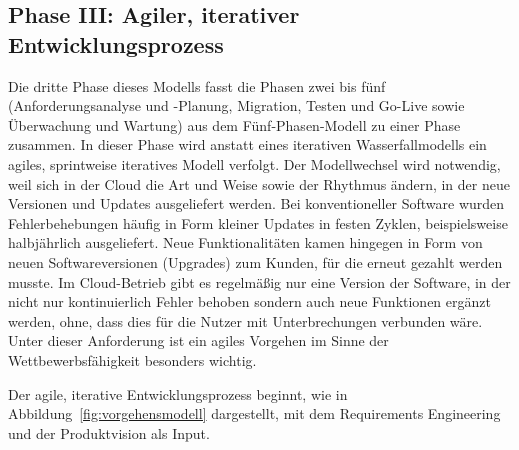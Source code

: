 \begin{comment}
\subsubsection{Technische Machbarkeit}


\subsubsection{Wirtschaftliche Machbarkeit}
"`In diesem Punkt unterscheidet sich Cloud-Computing von früheren Paradigmen
wie Outsourcing, welches nicht auf das Geschäftsmodell des Unternehmens wirken
will. Durch neue Anwendungsszenarien kann mit Cloud-Computing ein beachtlicher
Mehrwert geschaffen werden."' \pcite{}{154}{cloud_migration}

"`Alle Empfehlungen sollten mit einem Business Case hinterlegt werden, der
die Höhe der Kostenreduktion und die Verbesserung des Servicelevels zeigt."'
\pcite{}{158}{cloud_migration}
\end{comment}


\subsection{Phase III: Agiler, iterativer Entwicklungsprozess}
Die dritte Phase dieses Modells fasst die Phasen zwei bis fünf 
(Anforderungsanalyse und -Planung, Migration, Testen und Go-Live sowie 
Überwachung und Wartung) aus dem Fünf-Phasen-Modell zu einer Phase zusammen. In 
dieser Phase wird anstatt eines iterativen Wasserfallmodells ein agiles, 
sprintweise iteratives Modell verfolgt. Der Modellwechsel wird 
notwendig, weil sich in der Cloud die Art und Weise sowie der Rhythmus ändern, 
in der neue Versionen und Updates ausgeliefert werden. Bei konventioneller 
Software wurden Fehlerbehebungen häufig in Form kleiner Updates in festen 
Zyklen, beispielsweise halbjährlich ausgeliefert. Neue Funktionalitäten kamen 
hingegen in Form von neuen Softwareversionen (Upgrades) zum Kunden, für die 
erneut gezahlt werden musste. Im Cloud-Betrieb gibt es regelmäßig  nur eine 
Version der Software, in der nicht nur kontinuierlich Fehler behoben 
sondern auch neue Funktionen ergänzt werden, ohne, dass dies für die Nutzer mit 
Unterbrechungen verbunden wäre. 
 Unter 
dieser Anforderung ist ein agiles Vorgehen im Sinne der Wettbewerbsfähigkeit 
besonders wichtig.

Der agile, iterative Entwicklungsprozess beginnt, wie in 
Abbildung~\ref{fig:vorgehensmodell} dargestellt, mit dem Requirements 
Engineering und der Produktvision als Input.

